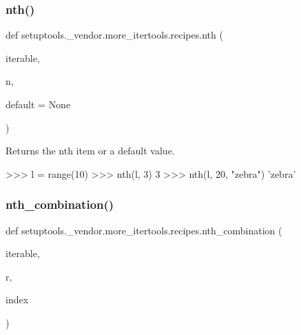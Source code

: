 \subsubsection{\texorpdfstring{nth()}{nth()}}
{\footnotesize\ttfamily def setuptools.\+\_\+vendor.\+more\+\_\+itertools.\+recipes.\+nth (\begin{DoxyParamCaption}\item[{}]{iterable,  }\item[{}]{n,  }\item[{}]{default = {\ttfamily None} }\end{DoxyParamCaption})}

\begin{DoxyVerb}Returns the nth item or a default value.

>>> l = range(10)
>>> nth(l, 3)
3
>>> nth(l, 20, "zebra")
'zebra'\end{DoxyVerb}
 \mbox{\label{namespacesetuptools_1_1__vendor_1_1more__itertools_1_1recipes_a1cf712ce53166cc883ad2f06d696044e}} 
\subsubsection{\texorpdfstring{nth\+\_\+combination()}{nth\_combination()}}
{\footnotesize\ttfamily def setuptools.\+\_\+vendor.\+more\+\_\+itertools.\+recipes.\+nth\+\_\+combination (\begin{DoxyParamCaption}\item[{}]{iterable,  }\item[{}]{r,  }\item[{}]{index }\end{DoxyParamCaption})}

